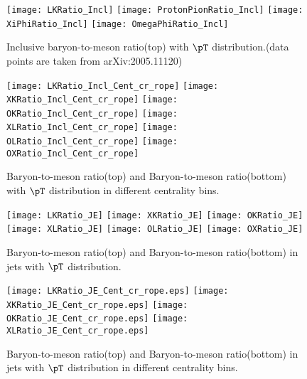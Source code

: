 \begin{figure}[ht]
        \begin{center}
                \texttt{[image: LKRatio\_Incl]}
                \texttt{[image: ProtonPionRatio\_Incl]}
                \texttt{[image: XiPhiRatio\_Incl]}
                \texttt{[image: OmegaPhiRatio\_Incl]}
        \end{center}
	\caption{Inclusive baryon-to-meson ratio(top) with $\pT$ distribution.(data points are taken from arXiv:2005.11120)}
        \label{fig:InclBtMratio}
\end{figure}

\begin{figure}[ht]
        \begin{center}
                \texttt{[image: LKRatio\_Incl\_Cent\_cr\_rope]}
                \texttt{[image: XKRatio\_Incl\_Cent\_cr\_rope]}
                \texttt{[image: OKRatio\_Incl\_Cent\_cr\_rope]}
                \texttt{[image: XLRatio\_Incl\_Cent\_cr\_rope]}
                \texttt{[image: OLRatio\_Incl\_Cent\_cr\_rope]}
                \texttt{[image: OXRatio\_Incl\_Cent\_cr\_rope]}
        \end{center}
	\caption{Baryon-to-meson ratio(top) and Baryon-to-meson ratio(bottom) with $\pT$ distribution in different centrality bins.}
        \label{fig:InclParRatioCent}
\end{figure}

\begin{figure}[ht]
        \begin{center}
                \texttt{[image: LKRatio\_JE]}
                \texttt{[image: XKRatio\_JE]}
                \texttt{[image: OKRatio\_JE]}
                \texttt{[image: XLRatio\_JE]}
                \texttt{[image: OLRatio\_JE]}
                \texttt{[image: OXRatio\_JE]}
        \end{center}
        \caption{Baryon-to-meson ratio(top) and Baryon-to-meson ratio(bottom) in jets with $\pT$ distribution.}
        \label{fig:JEParRatio}
\end{figure}

\begin{figure}[ht]
        \begin{center}
                \texttt{[image: LKRatio\_JE\_Cent\_cr\_rope.eps]}
                \texttt{[image: XKRatio\_JE\_Cent\_cr\_rope.eps]}
                \texttt{[image: OKRatio\_JE\_Cent\_cr\_rope.eps]}
                \texttt{[image: XLRatio\_JE\_Cent\_cr\_rope.eps]}
        \end{center}
        \caption{Baryon-to-meson ratio(top) and Baryon-to-meson ratio(bottom) in jets with $\pT$ distribution in different centrality bins.}
        \label{fig:JEParRatioCent}
\end{figure}
